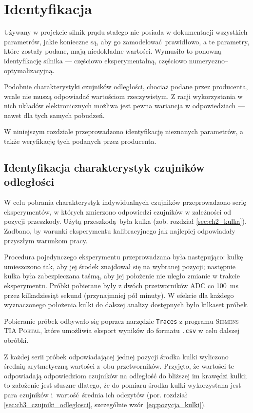 \chapter{Identyfikacja}
\label{cha:ch5_identyfikacja}

Używany w projekcie silnik prądu stałego nie posiada w dokumentacji wszystkich parametrów, jakie konieczne są, aby go zamodelować prawidłowo, a te parametry, które zostały podane, mają niedokładne wartości. Wymusiło to ponowną identyfikację silnika --- częściowo eksperymentalną, częściowo numeryczno--optymalizacyjną.

Podobnie charakterystyki czujników odległości, chociaż podane przez producenta, wcale nie muszą odpowiadać wartościom rzeczywistym. Z racji wykorzystania w nich układów elektronicznych możliwa jest pewna wariancja w odpowiedziach --- nawet dla tych samych pobudzeń.

W niniejszym rozdziale przeprowadzono identyfikację nieznanych parametrów, a także weryfikację tych podanych przez producenta.

\section{Identyfikacja charakterystyk czujników odległości}
\label{sec:ch5_identyfikacja_charakterystyk_czujnikow}

W celu pobrania charakterystyk indywidualnych czujników przeprowadzono serię eksperymentów, w których zmierzono odpowiedzi czujników w zależności od pozycji przeszkody. Użytą przeszkodą była kulka (zob. rozdział \ref{sec:ch2_kulka}). Zadbano, by warunki eksperymentu kalibracyjnego jak najlepiej odpowiadały przyszłym warunkom pracy.

Procedura pojedynczego eksperymentu przeprowadzana była następująco: kulkę umieszczono tak, aby jej środek znajdował się na wybranej pozycji; następnie kulka była zabezpieczana taśmą, aby jej położenie nie uległo zmianie w trakcie eksperymentu. Próbki pobierane były z dwóch przetworników ADC co \SI{100}{\milli\second} przez kilkadziesiąt sekund (przynajmniej pół minuty). W efekcie dla każdego wyznaczonego położenia kulki do dalszej analizy dostępnych było kilkaset próbek.

Pobieranie próbek odbywało się poprzez narzędzie \texttt{Traces} z programu \textsc{Siemens TIA Portal}, które umożliwia eksport wyników do formatu \texttt{.csv} w celu dalszej obróbki.

Z każdej serii próbek odpowiadającej jednej pozycji środka kulki wyliczono średnią arytmetyczną wartości z~obu przetworników. Przyjęto, że wartości te odpowiadają odpowiedziom czujników na odległość do bliższej im krawędzi kulki; to założenie jest słuszne dlatego, że do pomiaru środka kulki wykorzystana jest para czujników i~wartość średnia ich odczytów (por. rozdział \ref{sec:ch3_czujniki_odleglosci}, szczególnie wzór~\eqref{eq:pozycja_kulki}).

